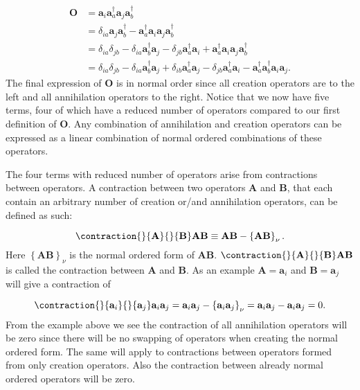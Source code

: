 \documentclass[graybox,sectrefs,envcountresetchap,open=right]{svmonodo}
\begin{document}
\begin{align}
\mathbf{O} & = 
\mathbf{a}_i 
\mathbf{a}^{\dagger}_a 
\mathbf{a}_j 
\mathbf{a}^{\dagger}_b \label{normalorder} \\ &
= \delta_{ia} 
\mathbf{a}_j 
\mathbf{a}^{\dagger}_b - 
\mathbf{a}^{\dagger}_a 
\mathbf{a}_i  
\mathbf{a}_j 
\mathbf{a}^{\dagger}_b \nonumber \\ &
= \delta_{ia} \delta_{jb} -
\delta_{ia} 
\mathbf{a}^{\dagger}_b
\mathbf{a}_j -
\delta_{jb}
\mathbf{a}^{\dagger}_a
\mathbf{a}_i +
\mathbf{a}^{\dagger}_a
\mathbf{a}_i
\mathbf{a}_j
\mathbf{a}^{\dagger}_b \nonumber \\ &
= \delta_{ia} \delta_{jb} - 
\delta_{ia} 
\mathbf{a}^{\dagger}_b
\mathbf{a}_j +
\delta_{ib} 
\mathbf{a}^{\dagger}_a
\mathbf{a}_j -
\delta_{jb} 
\mathbf{a}^{\dagger}_a
\mathbf{a}_i -
\mathbf{a}^{\dagger}_a
\mathbf{a}^{\dagger}_b
\mathbf{a}_i
\mathbf{a}_j .
\end{align} 
The final expression of $\mathbf{O}$ is in normal order since all creation operators are to the left and all annihilation operators to the right. Notice that we now have five terms, four of which have a reduced number of operators compared to our first definition of $\mathbf{O}$. Any combination of annihilation and creation operators can be expressed as a linear combination of normal ordered combinations of these operators. 

The four terms with reduced number of operators arise from contractions between operators. A contraction between two operators $\mathbf{A}$ and $\mathbf{B}$, that each contain an arbitrary number of creation or/and annihilation operators, can be defined as such:

\begin{equation}
\contraction{}{\mathbf{A}}{}{\mathbf{B}}
\mathbf{A}\mathbf{B}
 \equiv \mathbf{A}\mathbf{B} - \left\{ \mathbf{A}\mathbf{B} \right\}_{\nu} .
\end{equation} 
Here $\left\{ \mathbf{A}\mathbf{B} \right\}_{\nu}$ is the normal ordered form of $\mathbf{A}\mathbf{B}$. $\contraction{}{\mathbf{A}}{}{\mathbf{B}}
\mathbf{A}\mathbf{B}$ is called the contraction between $\mathbf{A}$ and $\mathbf{B}$. As an example $\mathbf{A} = \mathbf{a}_i$ and $\mathbf{B} = \mathbf{a}_j$ will give a contraction of

\begin{equation}
\contraction{}{\mathbf{a}_i}{}{\mathbf{a}_j}
\mathbf{a}_i\mathbf{a}_j
= \mathbf{a}_i \mathbf{a}_j - \left\{ \mathbf{a}_i \mathbf{a}_j \right\}_{\nu} = \mathbf{a}_i \mathbf{a}_j - \mathbf{a}_i \mathbf{a}_j = 0 . \label{wickexample1}
\end{equation} 
From the example above we see the contraction of all annihilation operators will be zero since there will be no swapping of operators when creating the normal ordered form. The same will apply to contractions between operators formed from only creation operators. Also the contraction between already normal ordered operators will be zero. 
\end{document}
